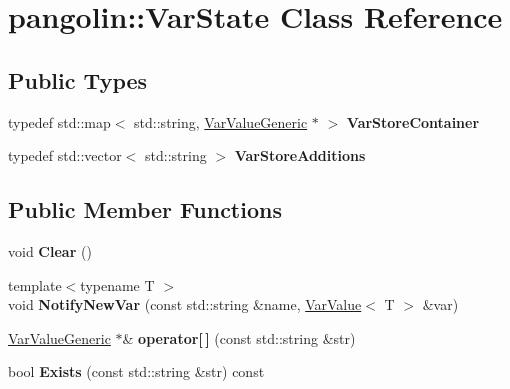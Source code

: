 \hypertarget{classpangolin_1_1_var_state}{}\section{pangolin\+:\+:Var\+State Class Reference}
\label{classpangolin_1_1_var_state}
\subsection*{Public Types}
\begin{DoxyCompactItemize}
\item 
typedef std\+::map$<$ std\+::string, \hyperlink{classpangolin_1_1_var_value_generic}{Var\+Value\+Generic} $\ast$ $>$ {\bfseries Var\+Store\+Container}\hypertarget{classpangolin_1_1_var_state_a4b0f4490d5a2d774355568abab604827}{}\label{classpangolin_1_1_var_state_a4b0f4490d5a2d774355568abab604827}

\item 
typedef std\+::vector$<$ std\+::string $>$ {\bfseries Var\+Store\+Additions}\hypertarget{classpangolin_1_1_var_state_a83362aae7d05747448cd0caa039b5d0a}{}\label{classpangolin_1_1_var_state_a83362aae7d05747448cd0caa039b5d0a}

\end{DoxyCompactItemize}
\subsection*{Public Member Functions}
\begin{DoxyCompactItemize}
\item 
void {\bfseries Clear} ()\hypertarget{classpangolin_1_1_var_state_a2345876a86667af235fbfcd34d592765}{}\label{classpangolin_1_1_var_state_a2345876a86667af235fbfcd34d592765}

\item 
{\footnotesize template$<$typename T $>$ }\\void {\bfseries Notify\+New\+Var} (const std\+::string \&name, \hyperlink{classpangolin_1_1_var_value}{Var\+Value}$<$ T $>$ \&var)\hypertarget{classpangolin_1_1_var_state_a0c46301ad04fd79b3d39cf4aad06a27b}{}\label{classpangolin_1_1_var_state_a0c46301ad04fd79b3d39cf4aad06a27b}

\item 
\hyperlink{classpangolin_1_1_var_value_generic}{Var\+Value\+Generic} $\ast$\& {\bfseries operator\mbox{[}$\,$\mbox{]}} (const std\+::string \&str)\hypertarget{classpangolin_1_1_var_state_a7c47b668551ba9bec79af99417fbd22a}{}\label{classpangolin_1_1_var_state_a7c47b668551ba9bec79af99417fbd22a}

\item 
bool {\bfseries Exists} (const std\+::string \&str) const \hypertarget{classpangolin_1_1_var_state_ac1cb727a005c19f064512a707ff21ff6}{}\label{classpangolin_1_1_var_state_ac1cb727a005c19f064512a707ff21ff6}

\end{DoxyCompactItemize}
